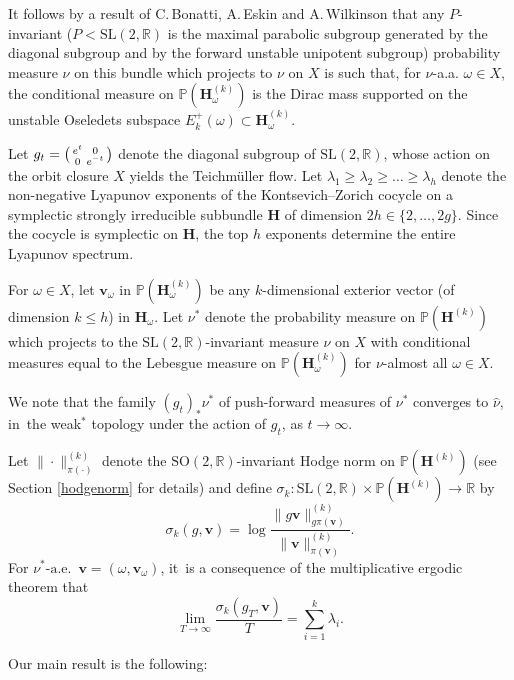 \documentclass[10pt]{amsart}
\newenvironment{smallpmatrix}{\big(\begin{smallmatrix}}{\end{smallmatrix}\big)}
\theoremstyle{plain}
\theoremstyle{definition}
\numberwithin{equation}{subsection}
\newcommand\bP{\mathbb{P}}
\newcommand\bR{\mathbb{R}}\let\R\bR
\newcommand{\SL}{\mathrm{SL}}
\newcommand{\SO}{\mathrm{SO}}
\newcommand{\bfH}{\boldsymbol{H}}
\newcommand{\bfv}{\boldsymbol{v}}
\begin{document}
It follows by a result of C.\,Bonatti, A.\,Eskin and A.\,Wilkinson \cite{BEW20} that any $P$\nobreakdash-invariant ($P<\SL(2,\R)$ is the maximal parabolic subgroup generated by the diagonal subgroup and by the forward unstable unipotent subgroup) probability measure $\hat{\nu}$ on this bundle which projects to $\nu$ on $X$ is such that, for $\nu$-a.a. $\omega\in X$, the conditional measure on $\bP (\bfH^{(k)}_\omega)$ is the Dirac mass supported on the unstable Oseledets subspace \hbox{$E^+_k(\omega)\subset \bfH^{(k)}_\omega$}.

Let $g_t=\begin{smallpmatrix}e^{t}&0\\0&e^{-t}\end{smallpmatrix}$ denote the diagonal subgroup of $\SL(2,\bR)$, whose action on the orbit closure $X$ yields the Teichmüller flow.
Let $\lambda_1\geq \lambda_2 \geq \dots \geq \lambda_h$ denote the non-negative Lyapunov exponents of the Kontsevich--Zorich cocycle on a symplectic strongly irreducible subbundle
$\bfH$ of dimension $2h\in \{2,\dots, 2g\}$. Since the cocycle is symplectic on $\bfH$, the top $h$ exponents determine the entire Lyapunov spectrum.

For $\omega\in X$, let $\bfv_\omega$ in $\bP (\bfH^{(k)}_\omega)$ be any $k$-dimensional exterior vector (of dimension $k\leq h$) in $\bfH_\omega$. Let $\nu^*$ denote the probability measure on $\bP (\bfH^{(k)})$ which projects to the $\SL(2,\R)$-invariant
measure $\nu$ on $X$ with conditional measures equal to the
Lebesgue measure on $\bP (\bfH^{(k)}_\omega)$ for $\nu$-almost all $\omega \in X$.

We note that the family \((g_t)_{\ast}\nu^{\ast}\) of push-forward measures of \(\nu^{\ast}\) converges to $\hat \nu$, in~the weak\(^\ast\) topology under the action of \(g_t\), as $t\to\infty$.

Let $\|\cdot\|^{(k)}_{\pi(\cdot)}$ denote the $\SO(2,\bR)$-invariant Hodge norm on $\bP (\bfH^{(k)})$ (see Section \ref{hodgenorm} for details) and define\vspace*{-3pt}
$\sigma_k : \SL(2,\bR) \times \bP (\bfH^{(k)}) \to \bR$ by
\[
\sigma_k(g,\bfv) = \log \frac{\|g \bfv\|^{(k)}_{g\pi(\bfv)}}{\|\bfv\|^{(k)}_{\pi(\bfv)}}.
\]
For $\nu^*\text{-a.e.}$~$\bfv = (\omega,\bfv_\omega)$, it~is a consequence of the multiplicative ergodic theorem that\vspace*{-3pt}
\[
\lim_{T\to\infty} \frac{\sigma_k(g_T, \bfv)}{T} = \sum_{i=1}^k \lambda_i.
\]

Our main result is the following:
\end{document}
